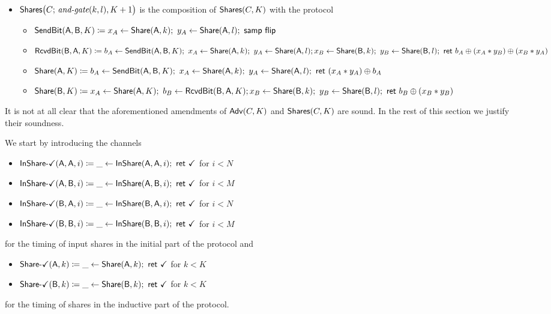 \begin{itemize}
\item $\mathsf{Shares}\big(C; \, \textit{and-gate}(k,l),K+1\big)$ is the composition of $\mathsf{Shares}(C,K)$ with the protocol
\begin{itemize}
\item $\SendBit(\A,\B,K) \coloneqq x_A \leftarrow \Share(\A,k); \ y_A \leftarrow \Share(\A,l); \ \samp{\flip}$
\item $\mathsf{RcvdBit}(\mathsf{B},\mathsf{A},K) \coloneqq b_A \leftarrow \mathsf{SendBit}(\mathsf{A},\mathsf{B},K); \ x_A \leftarrow \mathsf{Share}(\mathsf{A},k); \ y_A \leftarrow \mathsf{Share}(\mathsf{A},l); \\ x_B \leftarrow \mathsf{Share}(\mathsf{B},k); \ y_B \leftarrow \mathsf{Share}(\mathsf{B},l); \ \mathsf{ret} \ b_A \oplus (x_A * y_B) \oplus (x_B * y_A)$
\item $\mathsf{Share}(\mathsf{A},K) \coloneqq b_A \leftarrow \mathsf{SendBit}(\mathsf{A},\mathsf{B},K); \ x_A \leftarrow \mathsf{Share}(\mathsf{A},k); \ y_A \leftarrow \mathsf{Share}(\mathsf{A},l); \ \mathsf{ret} \ (x_A * y_A) \oplus b_A$
\item $\mathsf{Share}(\mathsf{B},K) \coloneqq x_A \leftarrow \mathsf{Share}(\mathsf{A},K); \ b_B \leftarrow \mathsf{RcvdBit}(\mathsf{B},\mathsf{A},K); \\ x_B \leftarrow \mathsf{Share}(\mathsf{B},k); \ y_B \leftarrow \mathsf{Share}(\mathsf{B},l); \ \mathsf{ret} \ b_B \oplus (x_B * y_B)$
\end{itemize}
\end{itemize}

\noindent It is not at all clear that the aforementioned amendments of $\mathsf{Adv}(C,K)$ and $\mathsf{Shares}(C,K)$ are sound. In the rest of this section we justify their soundness.\medskip

\noindent We start by introducing the channels
\begin{itemize}
\item {\color{teal} $\mathsf{InShare}\textsf{-}\checkmark(\mathsf{A},\mathsf{A},i) \coloneqq \_ \leftarrow \mathsf{InShare}(\mathsf{A},\mathsf{A},i); \ \mathsf{ret} \ \checkmark$ for $i < N$}
\item {\color{teal} $\mathsf{InShare}\textsf{-}\checkmark(\mathsf{A},\mathsf{B},i) \coloneqq \_ \leftarrow \mathsf{InShare}(\mathsf{A},\mathsf{B},i); \ \mathsf{ret} \ \checkmark$ for $i < M$}
\item {\color{teal} $\mathsf{InShare}\textsf{-}\checkmark(\mathsf{B},\mathsf{A},i) \coloneqq \_ \leftarrow \mathsf{InShare}(\mathsf{B},\mathsf{A},i); \ \mathsf{ret} \ \checkmark$ for $i < N$}
\item {\color{teal} $\mathsf{InShare}\textsf{-}\checkmark(\mathsf{B},\mathsf{B},i) \coloneqq \_ \leftarrow \mathsf{InShare}(\mathsf{B},\mathsf{B},i); \ \mathsf{ret} \ \checkmark$ for $i < M$}
\end{itemize}
for the timing of input shares in the initial part of the protocol and
\begin{itemize}
\item {\color{teal} $\mathsf{Share}\textsf{-}\checkmark(\mathsf{A},k) \coloneqq \_ \leftarrow \mathsf{Share}(\mathsf{A},k); \ \mathsf{ret} \ \checkmark$ for $k < K$}
\item {\color{teal} $\mathsf{Share}\textsf{-}\checkmark(\mathsf{B},k) \coloneqq \_ \leftarrow \mathsf{Share}(\mathsf{B},k); \ \mathsf{ret} \ \checkmark$ for $k < K$}
\end{itemize}
for the timing of shares in the inductive part of the protocol.\medskip

